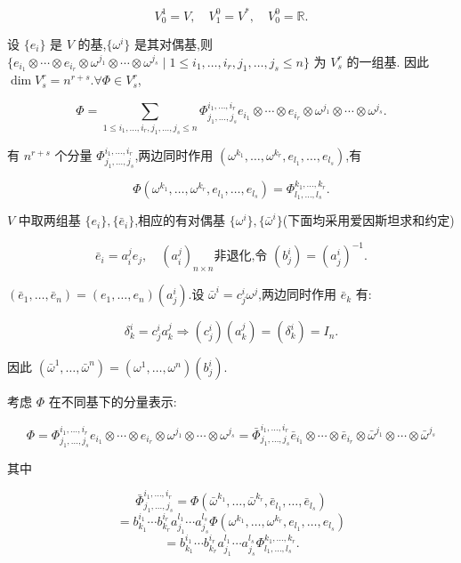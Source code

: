 \[
V_0^1 = V, \quad V_1^0 = V^*, \quad V_0^0 = \mathbb{R}.
\]

设 $\{e_i\}$ 是 $V$ 的基,$\{\omega^i\}$ 是其对偶基,则 $\{e_{i_1} \otimes \cdots \otimes e_{i_r} \otimes \omega^{j_1} \otimes \cdots \otimes \omega^{j_s} \mid 1 \leq i_1, \ldots, i_r, j_1, \ldots, j_s \leq n\}$ 为 $V_s^r$ 的一组基.
因此 $\dim V_s^r = n^{r+s}$.$\forall \Phi \in V_s^r$,

\[
\Phi = \sum_{1 \leq i_1, \ldots, i_r, j_1, \ldots, j_s \leq n} \Phi_{j_1, \ldots, j_s}^{i_1, \ldots, i_r} e_{i_1} \otimes \cdots \otimes e_{i_r} \otimes \omega^{j_1} \otimes \cdots \otimes \omega^{j_s}.
\]

有 $n^{r+s}$ 个分量 $\Phi_{j_1, \ldots, j_s}^{i_1, \ldots, i_r}$,两边同时作用 $(\omega^{k_1}, \ldots, \omega^{k_r}, e_{l_1}, \ldots, e_{l_s})$,有

\[
\Phi(\omega^{k_1}, \ldots, \omega^{k_r}, e_{l_1}, \ldots, e_{l_s}) = \Phi_{l_1, \ldots, l_s}^{k_1, \ldots, k_r}.
\]

$V$ 中取两组基 $\{e_i\}, \{\bar{e}_i\}$,相应的有对偶基 $\{\omega^i\}, \{\bar{\omega}^i\}$(下面均采用爱因斯坦求和约定)

\[
\bar{e}_i = a_i^j e_j, \quad (a_i^j)_{n \times n} \text{非退化,令 } (b_j^i) = (a_j^i)^{-1}.
\]

$(\bar{e}_1, \ldots, \bar{e}_n) = (e_1, \ldots, e_n)(a_j^i)$.设 $\bar{\omega}^i = c_j^i \omega^j$,两边同时作用 $\bar{e}_k$ 有:

\[
\delta_k^i = c_j^i a_k^j \Rightarrow (c_j^i)(a_k^j) = (\delta_k^i) = I_n.
\]

因此 $(\bar{\omega}^1, \ldots, \bar{\omega}^n) = (\omega^1, \ldots, \omega^n)(b_j^i)$.

考虑 $\Phi$ 在不同基下的分量表示:

\[
\Phi = \Phi_{j_1, \ldots, j_s}^{i_1, \ldots, i_r} e_{i_1} \otimes \cdots \otimes e_{i_r} \otimes \omega^{j_1} \otimes \cdots \otimes \omega^{j_s} = \bar{\Phi}_{j_1, \ldots, j_s}^{i_1, \ldots, i_r} \bar{e}_{i_1} \otimes \cdots \otimes \bar{e}_{i_r} \otimes \bar{\omega}^{j_1} \otimes \cdots \otimes \bar{\omega}^{j_s}
\]

其中

\[
\bar{\Phi}_{j_1, \ldots, j_s}^{i_1, \ldots, i_r} = \Phi(\bar{\omega}^{k_1}, \ldots, \bar{\omega}^{k_r}, \bar{e}_{l_1}, \ldots, \bar{e}_{l_s})
\]
\[
= b_{k_1}^{i_1} \cdots b_{k_r}^{i_r} a_{j_1}^{l_1} \cdots a_{j_s}^{l_s} \Phi(\omega^{k_1}, \ldots, \omega^{k_r}, e_{l_1}, \ldots, e_{l_s})
\]
\[
= b_{k_1}^{i_1} \cdots b_{k_r}^{i_r} a_{j_1}^{l_1} \cdots a_{j_s}^{l_s} \Phi_{l_1, \ldots, l_s}^{k_1, \ldots, k_r}.
\]

